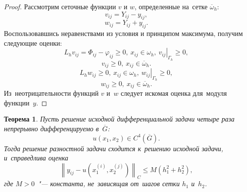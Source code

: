 \documentclass[11pt,a4paper,twoside,listtotoc,bibtotoc]{report}
\numberwithin{equation}{section}
\theoremstyle{definition}
\theoremstyle{plain}
\newtheorem{theorem}{Теорема}[section]
\begin{document}
\begin{proof}
    Рассмотрим сеточные функции $v$ и $w$, определенные
    на~сетке $\overline{\omega}_h$:
    $$
        v_{ij} = Y_{ij} - y_{ij},
    $$
    $$
        w_{ij}=Y_{ij}+y_{ij}.
    $$
    Воспользовавшись неравенствами из условия и принципом максимума,
    получим следующие оценки:
    $$
        L_hv_{ij}=\Phi_{ij} - \varphi_{ij} \geqslant 0,~x_{ij}\in\omega_h,
        ~\left.v_{ij}\right\vert_{\Gamma_h} \geqslant 0,
    $$
    $$
        v_{ij} \geqslant 0,~x_{ij}\in\overline{\omega}_h.
    $$
    $$
        L_hw_{ij} \geqslant 0,~x_{ij}\in\omega_h,
        ~\left.w_{ij}\right\vert_{\Gamma_h} \geqslant 0,
    $$
    $$
        w_{ij} \geqslant 0,~x_{ij}\in\overline{\omega}_h.
    $$
    Из~неотрицательности функций $v$ и~$w$ следует искомая оценка
    для~модуля функции~$y$.
\end{proof}
%
%
\begin{theorem}
    Пусть решение исходной дифференциальной задачи четыре раза непрерывно
    дифференцируемо в~$\overline{G}$:
    $$
        u(x_1,x_2) \in C^4\left(\overline{G}\right).
    $$
    Тогда решение разностной задачи сходится к~решению исходной задачи, и~справедлива
    оценка
    $$
        \left\lVert y_{ij}-u\left(x_1^{(i)},x_2^{(j)}\right)\right\rVert_C
        \leqslant M\left(h_1^2+h_2^2\right),
    $$
    где $M > 0$~"--- константа, не~зависящая от~шагов сетки $h_1$ и~$h_2$.
\end{theorem}
%
%
\end{document}
